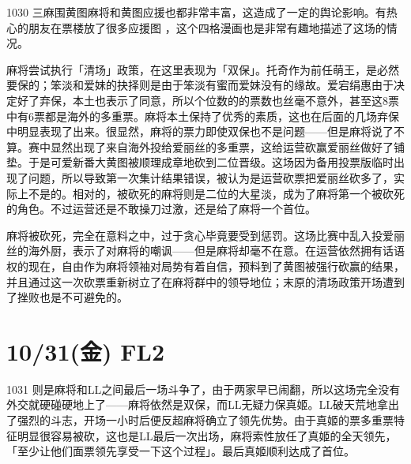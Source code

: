1030 三麻围黄图麻将和黄图应援也都非常丰富，这造成了一定的舆论影响。有热心的朋友在票楼放了很多应援图
，这个四格漫画也是非常有趣地描述了这场的情况。

麻将尝试执行「清场」政策，在这里表现为「双保」。托奇作为前任萌王，是必然要保的；笨淡和爱妹的抉择则是由于笨淡有蜜而爱妹没有的缘故。爱宕绢惠由于决定好了弃保，本土也表示了同意，所以个位数的的票数也丝毫不意外，甚至这8票中有6票都是海外的多重票。麻将本土保持了优秀的素质，这也在后面的几场弃保中明显表现了出来。很显然，麻将的票力即使双保也不是问题——但是麻将说了不算。赛中显然出现了来自海外投给爱丽丝的多重票，这给运营砍赢爱丽丝做好了铺垫。于是可爱新番大黄图被顺理成章地砍到二位晋级。这场因为备用投票版临时出现了问题，所以导致第一次集计结果错误，被认为是运营砍票把爱丽丝砍多了，实际上不是的。相对的，被砍死的麻将则是二位的大星淡，成为了麻将第一个被砍死的角色。不过运营还是不敢操刀过激，还是给了麻将一个首位。

麻将被砍死，完全在意料之中，过于贪心毕竟要受到惩罚。这场比赛中乱入投爱丽丝的海外厨，表示了对麻将的嘲讽——但是麻将却毫不在意。在运营依然拥有话语权的现在，自由作为麻将领袖对局势有着自信，预料到了黄图被强行砍赢的结果，并且通过这一次砍票重新树立了在麻将群中的领导地位；末原的清场政策开场遭到了挫败也是不可避免的。

\section{10/31(金) FL2}


1031 则是麻将和LL之间最后一场斗争了，由于两家早已闹翻，所以这场完全没有外交就硬碰硬地上了——麻将依然是双保，而LL无疑力保真姬。LL破天荒地拿出了强烈的斗志，开场一小时后便反超麻将确立了领先优势。由于真姬的票多重票特征明显很容易被砍，这也是LL最后一次出场，麻将索性放任了真姬的全天领先，「至少让他们面票领先享受一下这个过程」。最后真姬顺利达成了首位。

